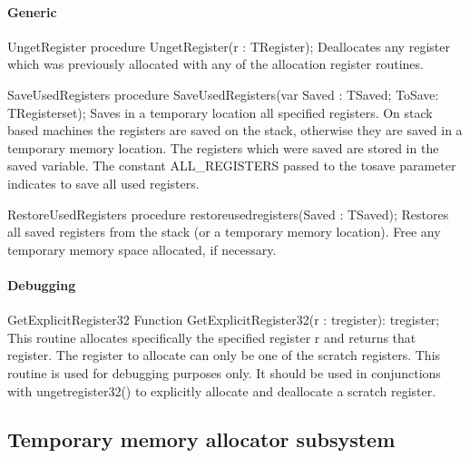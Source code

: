 \documentclass [a4paper,12pt]{article}
\begin{document}
\paragraph{Generic}

\begin{procedure}{UngetRegister}
\Declaration
procedure UngetRegister(r : TRegister);
\Description
Deallocates any register which was previously allocated with any of the
allocation register routines.
\end{procedure}

\begin{function}{SaveUsedRegisters}
\Declaration
procedure SaveUsedRegisters(var Saved : TSaved; ToSave: TRegisterset);
\Description
Saves in a temporary location all specified registers. On stack based
machines the registers are saved on the stack, otherwise they are saved in a
temporary memory location. The registers which were saved are stored in the
\textsf{saved} variable. The constant \textsf{ALL{\_}REGISTERS} passed to
the \textsf{tosave} parameter indicates to save all used registers.
\end{function}

\begin{function}{RestoreUsedRegisters}
\Declaration
procedure restoreusedregisters(Saved : TSaved);
\Description
Restores all saved registers from the stack (or a temporary memory
location). Free any temporary memory space allocated, if necessary.
\end{function}

\paragraph{Debugging}

\begin{function}{GetExplicitRegister32}
\Declaration
Function GetExplicitRegister32(r : tregister): tregister;
\Description
This routine allocates specifically the specified register \textsf{r }and
returns that register. The register to allocate can only be one of the
scratch registers.
\Notes
This routine is used for debugging purposes only. It should be used in
conjunctions with ungetregister32() to explicitly allocate and deallocate a
scratch register.
\end{function}

\subsection{Temporary memory allocator subsystem}
\label{subsec:temporary}
\end{document}
